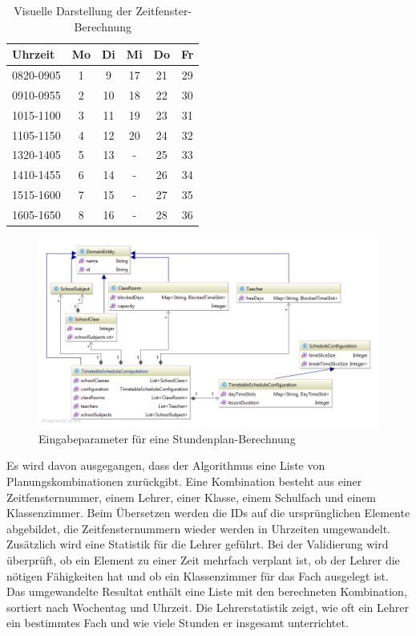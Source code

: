 \begin{table}[ht]
\centering
  \begin{tabular}{ l | c | c | c | c | c }
	\hline
	\rowcolor{gray}
	\textbf{Uhrzeit} 	& \textbf{Mo}	& \textbf{Di} 	& \textbf{Mi}	&  \textbf{Do}	&  \textbf{Fr}\\ \hline
	0820-0905		& 1			& 9			& 17			& 21			& 29		\\ \hline
	0910-0955		& 2			& 10			& 18			& 22			& 30		\\ \hline
	1015-1100		& 3			& 11			& 19			& 23			& 31		\\ \hline
	1105-1150		& 4			& 12			& 20			& 24			& 32		\\ \hline \hline
	1320-1405		& 5			& 13			& -			& 25			& 33		\\ \hline
	1410-1455		& 6			& 14			& -			& 26			& 34		\\ \hline
	1515-1600		& 7			& 15			& -			& 27			& 35		\\ \hline
	1605-1650		& 8			& 16			& -			& 28			& 36		\\ \hline
  \end{tabular}
   \caption{Visuelle Darstellung der Zeitfenster-Berechnung}\label{table:timeslice_calc}
\end{table}

\begin{figure}[h]
\centering
\includegraphics[scale=0.5]{images/probleme/timetableSchedule.png}
\caption[Eingabeparameter für eine Stundenplan-Berechnung]{Eingabeparameter für eine Stundenplan-Berechnung \selfmade{}}
\label{fig:timetableSchedule_input}
\end{figure}

\FloatBarrier

Es wird davon ausgegangen, dass der Algorithmus eine Liste von Planungskombinationen zurückgibt. Eine Kombination besteht aus einer Zeitfensternummer, einem Lehrer, einer Klasse, 
einem Schulfach und einem Klassenzimmer. Beim Übersetzen werden die IDs auf die ursprünglichen Elemente abgebildet, die Zeitfensternummern wieder werden in Uhrzeiten umgewandelt. 
Zusätzlich wird eine Statistik für die Lehrer geführt. Bei der Validierung wird überprüft, ob ein Element zu einer Zeit mehrfach verplant ist, ob der Lehrer die nötigen Fähigkeiten hat und ob ein 
Klassenzimmer für das Fach ausgelegt ist. Das umgewandelte Resultat enthält eine Liste mit den berechneten Kombination, sortiert nach Wochentag und Uhrzeit. Die Lehrerstatistik zeigt, wie 
oft ein Lehrer ein bestimmtes Fach und wie viele Stunden er insgesamt unterrichtet.

